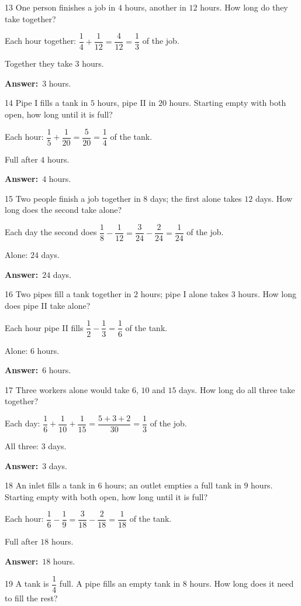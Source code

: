 \documentclass[11pt]{article}
\newif\ifsol \solfalse
\providecommand{\AnsWord}{Đáp số}
\newcommand{\dapso}[1]{\par\textbf{\AnsWord:}\ #1}
\newcommand{\probsol}[1]{%
  \begin{lrbox}{\solmeasure}\begin{minipage}{\dimexpr\linewidth-24pt\relax}#1\end{minipage}\end{lrbox}%
  \ifsol
    \begin{solbox}#1\end{solbox}%
  \else
    \setlength{\solht}{\dimexpr\ht\solmeasure+\dp\solmeasure+0.85cm\relax}%
    \ifdim\solht<1.35cm\setlength{\solht}{1.35cm}\fi
    \begin{tcolorbox}[colback=white,colframe=Line,boxrule=0.8pt,arc=5pt,
      left=8pt,right=8pt,top=4pt,bottom=4pt,height=\solht]{\footnotesize\color{Slate}\itshape\WorkWord}\end{tcolorbox}%
  \fi}
\newcommand{\gap}{\vspace{0.3cm}}
\def\WorkWord{Your work:}
\def\AnsWord{Answer}
\begin{document}
\gap
\begin{probbox}{13}{\relax}
One person finishes a job in $4$ hours, another in $12$ hours. How long do they take together?
\end{probbox}
\probsol{
Each hour together: $\dfrac14+\dfrac1{12}=\dfrac4{12}=\dfrac13$ of the job.\par Together they take $3$ hours.
\dapso{$3$ hours.}}
\gap
\begin{probbox}{14}{\relax}
Pipe I fills a tank in $5$ hours, pipe II in $20$ hours. Starting empty with both open, how long until it is full?
\end{probbox}
\probsol{
Each hour: $\dfrac15+\dfrac1{20}=\dfrac5{20}=\dfrac14$ of the tank.\par Full after $4$ hours.
\dapso{$4$ hours.}}
\gap
\begin{probbox}{15}{\relax}
Two people finish a job together in $8$ days; the first alone takes $12$ days. How long does the second take alone?
\end{probbox}
\probsol{
Each day the second does $\dfrac18-\dfrac1{12}=\dfrac3{24}-\dfrac2{24}=\dfrac1{24}$ of the job.\par Alone: $24$ days.
\dapso{$24$ days.}}
\gap
\begin{probbox}{16}{\relax}
Two pipes fill a tank together in $2$ hours; pipe I alone takes $3$ hours. How long does pipe II take alone?
\end{probbox}
\probsol{
Each hour pipe II fills $\dfrac12-\dfrac13=\dfrac16$ of the tank.\par Alone: $6$ hours.
\dapso{$6$ hours.}}
\gap
\begin{probbox}{17}{\relax}
Three workers alone would take $6$, $10$ and $15$ days. How long do all three take together?
\end{probbox}
\probsol{
Each day: $\dfrac16+\dfrac1{10}+\dfrac1{15}=\dfrac{5+3+2}{30}=\dfrac13$ of the job.\par All three: $3$ days.
\dapso{$3$ days.}}
\gap
\begin{probbox}{18}{\relax}
An inlet fills a tank in $6$ hours; an outlet empties a full tank in $9$ hours. Starting empty with both open, how long until it is full?
\end{probbox}
\probsol{
Each hour: $\dfrac16-\dfrac19=\dfrac3{18}-\dfrac2{18}=\dfrac1{18}$ of the tank.\par Full after $18$ hours.
\dapso{$18$ hours.}}
\gap
\begin{probbox}{19}{\relax}
A tank is $\dfrac14$ full. A pipe fills an empty tank in $8$ hours. How long does it need to fill the rest?
\end{probbox}
\end{document}
